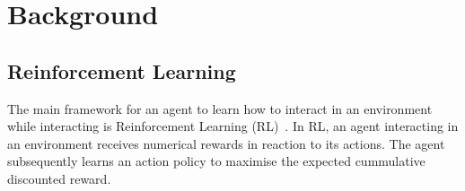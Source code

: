\documentclass[letterpaper]{article} %
\begin{document}

\section{Background}
\subsection{Reinforcement Learning}

The main framework for an agent to learn how to interact in an environment while
interacting is Reinforcement 
Learning (RL)~\cite{kober2013reinforcement,sutton1998reinforcement}. In RL, an
agent interacting in an environment
receives numerical rewards in reaction to its actions. The agent subsequently learns an action policy to maximise the expected cummulative discounted reward.
\end{document}
